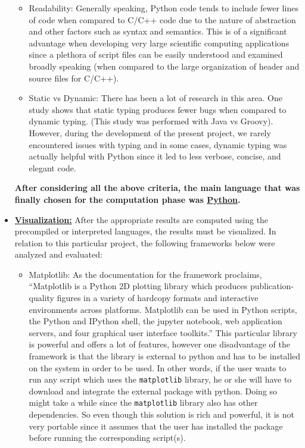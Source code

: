 \begin{itemize}
\begin{itemize}
        \item Readability: Generally speaking, Python code tends to include fewer lines of code when compared to C/C++ code due to the nature of abstraction and other factors such as syntax and semantics. This is of a significant advantage when developing very large scientific computing applications since a plethora of script files can be easily understood and examined broadly speaking (when compared to the large organization of header and source files for C/C++). 
        
        \item Static vs Dynamic: There has been a lot of research in this area. One study \cite{static-dynamic} shows that static typing produces fewer bugs when compared to dynamic typing. (This study was performed with Java vs Groovy). However, during the development of the present project, we rarely encountered issues with typing and in some cases, dynamic typing was actually helpful with Python since it led to less verbose, concise, and elegant code.  
    \end{itemize}
    
    \textbf{After considering all the above criteria, the main language that was finally chosen for the computation phase was \underline{Python}.}
    
    \item \textbf{\underline{Visualization:}} After the appropriate results are computed using the precompiled or interpreted languages, the results must be visualized. In relation to this particular project, the following frameworks below were analyzed and evaluated:
    
    \begin{itemize}
        \item Matplotlib: As the documentation for the framework proclaims, ``Matplotlib is a Python 2D plotting library which produces publication-quality figures in a variety of hardcopy formats and interactive environments across platforms. Matplotlib can be used in Python scripts, the Python and IPython shell, the jupyter notebook, web application servers, and four graphical user interface toolkits.'' This particular library is powerful and offers a lot of features, however one disadvantage of the framework is that the library is external to python and has to be installed on the system in order to be used. In other words, if the user wants to run any script which uses the \verb|matplotlib| library, he or she will have to download and integrate the external package with python. Doing so might take a while since the \verb|matplotlib| library also has other dependencies. So even though this solution is rich and powerful, it is not very portable since it assumes that the user has installed the package before running the corresponding script(s).\newline
        

\end{itemize}
\end{itemize}
